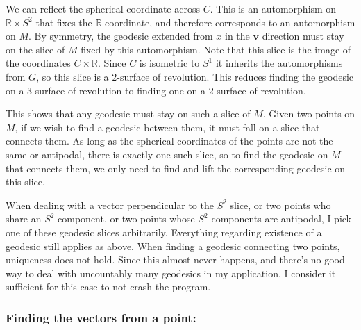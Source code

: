 We can reflect the spherical coordinate across $C$. This is an automorphism on $\mathbb{R} \times S^2$ that fixes the $\mathbb{R}$ coordinate, and therefore corresponds to an automorphism on $M$. By symmetry, the geodesic extended from $x$ in the $\textbf{v}$ direction must stay on the slice of $M$ fixed by this automorphism. Note that this slice is the image of the coordinates $C \times \mathbb{R}$. Since $C$ is isometric to $S^1$ it inherits the automorphisms from $G$, so this slice is a $2$-surface of revolution. This reduces finding the geodesic on a $3$-surface of revolution to finding one on a $2$-surface of revolution.

This shows that any geodesic must stay on such a slice of $M$. Given two points on $M$, if we wish to find a geodesic between them, it must fall on a slice that connects them. As long as the spherical coordinates of the points are not the same or antipodal, there is exactly one such slice, so to find the geodesic on $M$ that connects them, we only need to find and lift the corresponding geodesic on this slice.

\begin{remark}
When dealing with a vector perpendicular to the $S^2$ slice, or two points who share an $S^2$ component, or two points whose $S^2$ components are antipodal, I pick one of these geodesic slices arbitrarily. Everything regarding existence of a geodesic still applies as above. When finding a geodesic connecting two points, uniqueness does not hold. Since this almost never happens, and there's no good way to deal with uncountably many geodesics in my application, I consider it sufficient for this case to not crash the program.
\end{remark}



\bigskip

\subsubsection{Finding the vectors from a point:}

